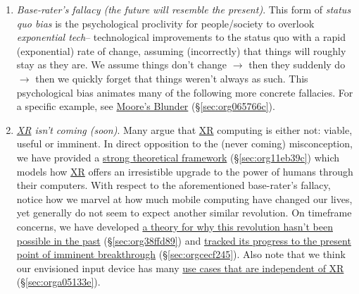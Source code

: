 \documentclass[logo,bsc,singlespacing,parskip]{infthesis}
\begin{document}
\begin{enumerate}
\item \emph{Base-rater's fallacy (the future will resemble the present)}.
This form of \emph{status quo bias} is the psychological proclivity for people/society to overlook \emph{exponential tech}-- technological improvements to the status quo with a rapid (exponential) rate of change, assuming (incorrectly) that things will roughly stay as they are.
We assume things don't change \(\rightarrow\) then they suddenly do \(\rightarrow\) then we quickly forget that things weren't always as such.
 This psychological bias animates many of the following more concrete fallacies.
 For a specific example, see \hyperref[sec:org065766c]{Moore's Blunder} (\S \ref{sec:org065766c}).

\item \emph{\hyperref[org53dbe83]{XR} isn't coming (soon)}.
Many argue that \hyperref[org53dbe83]{XR} computing is either not: viable, useful or imminent.
In direct opposition to the (never coming) misconception, we have provided a \hyperref[sec:org11eb39c]{strong theoretical framework} (\S \ref{sec:org11eb39c}) which models how \hyperref[org53dbe83]{XR} offers an irresistible upgrade to the power of humans through their computers.
With respect to the aforementioned base-rater's fallacy, notice how we marvel at how much mobile computing have changed our lives, yet generally do not seem to expect another similar revolution.
On timeframe concerns, we have developed \hyperref[sec:org38ffd89]{a theory for why this revolution hasn't been possible in the past} (\S \ref{sec:org38ffd89}) and \hyperref[sec:orgcecf245]{tracked its progress to the present point of imminent breakthrough} (\S \ref{sec:orgcecf245}).
Also note that we think our envisioned input device has many \hyperref[sec:orga05133e]{use cases that are independent of XR} (\S \ref{sec:orga05133e}).


\end{enumerate}
\end{document}
